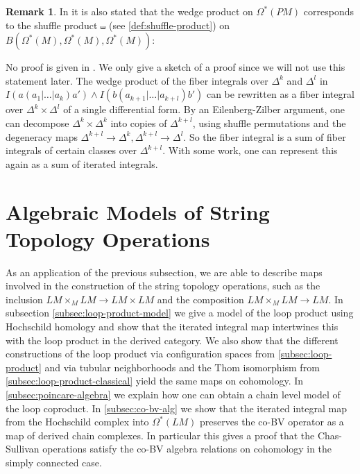\documentclass{scrartcl}
\theoremstyle{plain}
\theoremstyle{definition}
\newtheorem{remark}[theorem]{Remark}
\begin{document}
\begin{remark}
    In \cite{naef2019string} it is also stated that the wedge product on $\Omega^*(PM)$ corresponds to the shuffle product $\shuffle$ (see \cref{def:shuffle-product}) on $B(\Omega^*(M), \Omega^*(M), \Omega^*(M))$:
    \begin{center}
    \end{center}

    No proof is given in \cite{naef2019string}. We only give a sketch of a proof since we will not use this statement later. The wedge product of the fiber integrals over $\Delta^k$ and $\Delta^l$ in $I(a(a_1|\dots|a_k)a') \wedge I(b(a_{k+1}|\dots|a_{k+l})b')$ can be rewritten as a fiber integral over $\Delta^k\times\Delta^l$ of a single differential form. By an Eilenberg-Zilber argument, one can decompose $\Delta^{k}\times\Delta^k$ into copies of $\Delta^{k+l}$, using shuffle permutations and the degeneracy maps $\Delta^{k+l}\to \Delta^k, \Delta^{k+l}\to \Delta^l$. So the fiber integral is a sum of fiber integrals of certain classes over $\Delta^{k+l}$. With some work, one can represent this again as a sum of iterated integrals.
\end{remark}





\section{Algebraic Models of String Topology Operations}\label{sec:loop-models}
As an application of the previous subsection, we are able to describe maps involved in the construction of the string topology operations, such as the inclusion $LM\times_M LM\to LM\times LM$ and the composition $LM\times_M LM\to LM$. In subsection \cref{subsec:loop-product-model} we give a model of the loop product using Hochschild homology and show that the iterated integral map intertwines this with the loop product in the derived category. We also show that the different constructions of the loop product via configuration spaces from \cref{subsec:loop-product} and via tubular neighborhoods and the Thom isomorphism from \cref{subsec:loop-product-classical} yield the same maps on cohomology. In \cref{subsec:poincare-algebra} we explain how one can obtain a chain level model of the loop coproduct. In \cref{subsec:co-bv-alg} we show that the iterated integral map from the Hochschild complex into $\Omega^*(LM)$ preserves the co-BV operator as a map of derived chain complexes. In particular this gives a proof that the Chas-Sullivan operations satisfy the co-BV algebra relations  on cohomology in the simply connected case. 
\end{document}
